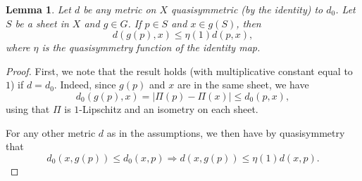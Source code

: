 \documentclass{amsart}
\theoremstyle{plain}
\newtheorem{lemma}[theorem]{Lemma}
\theoremstyle{definition}
\numberwithin{equation}{section}
\numberwithin{theorem}{section}
\begin{document}
\begin{lemma}\label{lem:sheetmove}
Let $d$ be any metric on $X$ quasisymmetric (by the identity) to $d_0$. Let $S$ be a sheet in $X$ and $g\in G$. If $p\in S $ and $x\in g(S)$, then
$$ d(g(p),x) \leq \eta(1) d(p,x),$$
where $\eta$ is the quasisymmetry function of the identity map.
\end{lemma}
\begin{proof}
First, we note that the result holds (with multiplicative constant equal to $1$) if $d=d_0$. Indeed, since $g(p)$ and $x$ are in the same sheet, we have
$$ d_0(g(p), x) = |\Pi(p)-\Pi(x)| \leq d_0(p,x), $$
using that $\Pi$ is $1$-Lipschitz and an isometry on each sheet.

For any other metric $d$ as in the assumptions, we then have by quasisymmetry that
$$ d_0(x,g(p))\leq d_0(x,p) \Rightarrow d(x,g(p)) \leq \eta(1) d(x,p).$$
\end{proof}
\end{document}
